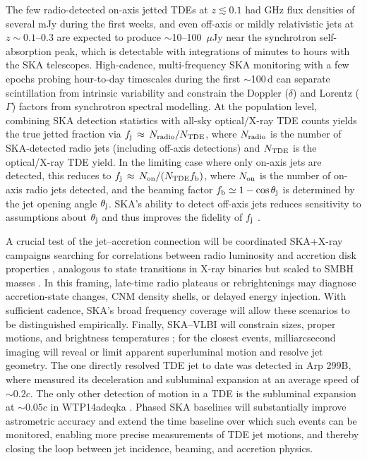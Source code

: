 \documentclass[a4paper,11pt]{article}
\begin{document}
The few radio-detected on-axis jetted TDEs at $z \lesssim 0.1$ had GHz flux densities of several mJy during the first weeks, and even off-axis or mildly relativistic jets at $z \sim 0.1$--0.3 are expected to produce $\sim$10--100~$\mu$Jy near the synchrotron self-absorption peak, which is detectable with integrations of minutes to hours with the SKA telescopes. High-cadence, multi-frequency SKA monitoring with a few epochs probing hour-to-day timescales during the first $\sim$100\,d can separate scintillation from intrinsic variability and constrain the Doppler ($\delta$) and Lorentz ($\Gamma$) factors from synchrotron spectral modelling. At the population level, combining SKA detection statistics with all-sky optical/X-ray TDE counts yields the true jetted fraction via
$f_{\rm j}\,\approx\, N_{\rm radio}/N_{\rm TDE}$,
where $N_{\rm radio}$ is the number of SKA-detected radio jets (including off-axis detections) and $N_{\rm TDE}$ is the optical/X-ray TDE yield. In the limiting case where only on-axis jets are detected, this reduces to $f_{\rm j}\,\approx\, N_{\rm on}/(N_{\rm TDE} f_{\rm b})$, where $N_{\rm on}$ is the number of on-axis radio jets detected, and the beaming factor $f_{\rm b}\simeq 1-\cos\theta_{\rm j}$ is determined by the jet opening angle $\theta_{\rm j}$. SKA's ability to detect off-axis jets reduces sensitivity to assumptions about $\theta_{\rm j}$ and thus improves the fidelity of $f_{\rm j}$ \citep{vanVelzen2021}.

A crucial test of the jet--accretion connection will be coordinated SKA+X-ray campaigns searching for correlations between radio luminosity and accretion disk properties \citep{Mummery2025}, analogous to state transitions in X-ray binaries but scaled to SMBH masses \citep{Merloni2003,Fender2004}. In this framing, late-time radio plateaus or rebrightenings \cite[e.g., AT2020vwl;][]{Goodwin2025} may diagnose accretion-state changes, CNM density shells, or delayed energy injection. With sufficient cadence, SKA's broad frequency coverage will allow these scenarios to be distinguished empirically. Finally, SKA–VLBI will constrain sizes, proper motions, and brightness
temperatures \citep{Shu.1.2026.SKA}; for the closest events, milliarcsecond imaging will reveal or limit apparent superluminal motion and resolve jet geometry. 
The one directly resolved TDE jet to date was detected in Arp 299B, where \citet{Mattila2018} measured its deceleration and subluminal expansion at an average speed of $\sim 0.2 c$. The only other detection of motion in a TDE is the subluminal expansion at $\sim 0.05c$ in WTP14adeqka \citep{Golay2025}.
Phased SKA baselines will substantially improve astrometric accuracy and extend the time baseline over which such events can be monitored, enabling more precise measurements of TDE jet motions, and thereby closing the loop between jet incidence, beaming, and accretion physics.
\end{document}
